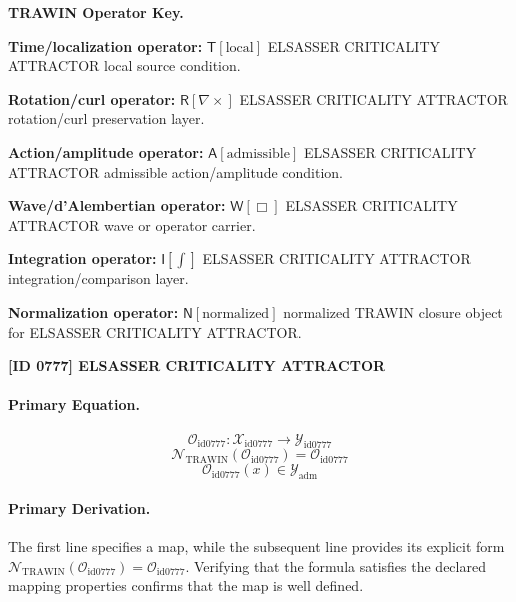 \par\vspace{0.45\baselineskip}
\noindent\begin{minipage}[t]{\linewidth}
\begingroup
\small
\raggedright
\textbf{TRAWIN Operator Key.}\par
\noindent\textbf{Time/localization operator:} $\mathsf{T}\!\left[\mathrm{local}\right]$ ELSASSER CRITICALITY ATTRACTOR local source condition.\par
\noindent\textbf{Rotation/curl operator:} $\mathsf{R}\!\left[\nabla\times\right]$ ELSASSER CRITICALITY ATTRACTOR rotation/curl preservation layer.\par
\noindent\textbf{Action/amplitude operator:} $\mathsf{A}\!\left[\mathrm{admissible}\right]$ ELSASSER CRITICALITY ATTRACTOR admissible action/amplitude condition.\par
\noindent\textbf{Wave/d'Alembertian operator:} $\mathsf{W}\!\left[\Box\right]$ ELSASSER CRITICALITY ATTRACTOR wave or operator carrier.\par
\noindent\textbf{Integration operator:} $\mathsf{I}\!\left[\int\right]$ ELSASSER CRITICALITY ATTRACTOR integration/comparison layer.\par
\noindent\textbf{Normalization operator:} $\mathsf{N}\!\left[\mathrm{normalized}\right]$ normalized TRAWIN closure object for ELSASSER CRITICALITY ATTRACTOR.\par
\endgroup
\end{minipage}

\clearpage
\noindent\textbf{[ID 0777] ELSASSER CRITICALITY ATTRACTOR}\par
\vspace{0.35em}
\paragraph{Primary Equation.}
\[
\mathcal{O}_{\mathrm{id0777}}:\mathcal{X}_{\mathrm{id0777}}\longrightarrow\mathcal{Y}_{\mathrm{id0777}}
\]
\[
\mathcal{N}_{\mathrm{TRAWIN}}(\mathcal{O}_{\mathrm{id0777}})=\mathcal{O}_{\mathrm{id0777}}
\]
\[
\mathcal{O}_{\mathrm{id0777}}(x)\in\mathcal{Y}_{\mathrm{adm}}
\]

\paragraph{Primary Derivation.}
The first line specifies a map, while the subsequent line provides its explicit form \( \mathcal{N}_{\mathrm{TRAWIN}}(\mathcal{O}_{\mathrm{id0777}})=\mathcal{O}_{\mathrm{id0777}} \). Verifying that the formula satisfies the declared mapping properties confirms that the map is well defined.

